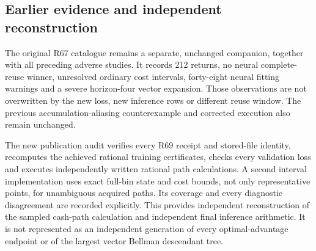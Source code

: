 \subsection{Earlier evidence and independent reconstruction}
The original R67 catalogue remains a separate, unchanged companion, together with all preceding adverse studies. It records 212 returns, no neural complete-reuse winner, unresolved ordinary cost intervals, forty-eight neural fitting warnings and a severe horizon-four vector expansion. Those observations are not overwritten by the new loss, new inference rows or different reuse window. The previous accumulation-aliasing counterexample and corrected execution also remain unchanged.

The new publication audit verifies every R69 receipt and stored-file identity, recomputes the achieved rational training certificates, checks every validation loss and executes independently written rational path calculations. A second interval implementation uses exact full-bin state and cost bounds, not only representative points, for unambiguous acquired paths. Its coverage and every diagnostic disagreement are recorded explicitly. This provides independent reconstruction of the sampled cash-path calculation and independent final inference arithmetic. It is not represented as an independent generation of every optimal-advantage endpoint or of the largest vector Bellman descendant tree.
